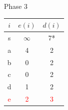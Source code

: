 \documentclass[hyperref={},
xcolor={dvipsnames,svgnames,table},10pt]{beamer}
\begin{document}
\begin{frame}{Phase 3}
\begin{minipage}[c]{0.3\linewidth}
	\end{minipage}\hfill 
	\begin{minipage}[c]{0.3\linewidth}
		\begin{tabular}{|c|c|c|}
			\hline
			$i$ & $e(i)$ & $d(i)$ \\ \hline
			s & $\infty$ & 7* \\ \hline
			a &  4 & 2 \\ \hline
			b &  0 & 2 \\ \hline
			c &  0 & 2 \\ \hline
			d &  1 & 2 \\ \hline
			\textcolor{red}{e} &  \textcolor{red}{2} & \textcolor{red}{3} \\ \hline
		\end{tabular}
	\end{minipage}
\end{frame}
\end{document}

